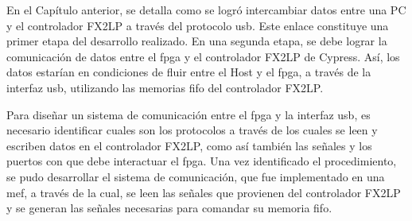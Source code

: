 En el Capítulo anterior, se detalla como se logró intercambiar datos entre una PC y el controlador FX2LP a través del protocolo \acrshort{usb}. Este enlace constituye una primer etapa del desarrollo realizado. En una segunda etapa, se debe lograr la comunicación de datos entre el \acrshort{fpga} y el controlador FX2LP de Cypress. Así, los datos estarían en condiciones de fluir entre el Host y el \acrshort{fpga}, a través de la interfaz \acrshort{usb}, utilizando las memorias \acrshort{fifo} del controlador FX2LP. 

Para diseñar un sistema de comunicación entre el \acrshort{fpga} y la interfaz \acrshort{usb}, es necesario identificar cuales son los protocolos a través de los cuales se leen y escriben datos en el controlador FX2LP, como así también las señales y los puertos con que debe interactuar el \acrshort{fpga}. Una vez identificado el procedimiento, se pudo desarrollar el sistema de comunicación, que fue implementado en una \acrfull{mef}, a través de la cual, se leen las señales que provienen del controlador FX2LP y se generan las señales necesarias para comandar su memoria \acrshort{fifo}.


%	
%	

